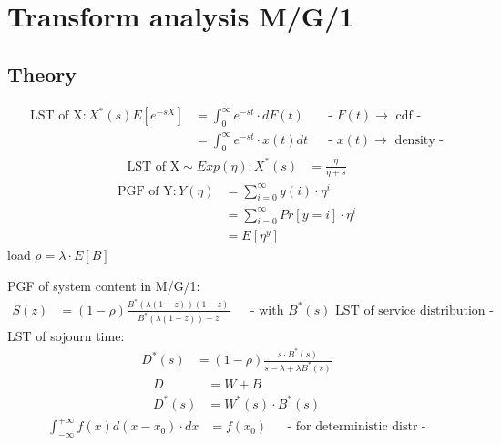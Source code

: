 \section{ Transform analysis M/G/1 }

\subsection*{ Theory }

\begin{align*}
\text{LST of X}:X^{{\ast }}\left(s\right)E\left[e^{{-sX}}\right]&=\int _{0}^{\infty }e^{{-st}}\cdot dF\left(t\right)&& \text{-  $F\left(t\right)\rightarrow $ cdf -}\\
&=\int _{0}^{\infty }e^{{-st}}\cdot x\left(t\right)dt&& \text{-  $x\left(t\right)\rightarrow $ density -}
\end{align*}
\begin{align*}
\text{LST of X} \sim Exp \left(\eta \right):X^{{\ast }}\left(s\right)&=\frac{\eta }{\eta +s}
\end{align*}
\begin{align*}
\text{PGF of Y}:Y\left(\eta \right)&=\sum _{{i=0}}^{\infty }y\left(i\right)\cdot \eta ^{i}\\
&=\sum _{{i=0}}^{\infty }Pr\left[y=i\right]\cdot \eta ^{i}\\
&=E\left[\eta ^{y}\right]
\end{align*}
load $\rho =\lambda \cdot E\left[B\right]$

PGF of system content in M/G/1:
\begin{align*}
S\left(z\right)&=\left(1-\rho \right)\frac{B^{{\ast }}\left(\lambda \left(1-z\right)\right)\left(1-z\right)}{B^{{\ast }}\left(\lambda \left(1-z\right)\right)-z}&& \text{-  with $B^{{\ast }}\left(s\right)$ LST of service distribution -}
\end{align*}
LST of sojourn time:
\begin{align*}
D^{{\ast }}\left(s\right)&=\left(1-\rho \right)\frac{s\cdot B^{{\ast }}\left(s\right)}{s-\lambda +\lambda B^{{\ast }}\left(s\right)}
\end{align*}
\begin{align*}
D&=W+B\\
D^{{\ast }}\left(s\right)&=W^{{\ast }}\left(s\right)\cdot B^{{\ast }}\left(s\right)
\end{align*}
\begin{align*}
\int _{{-\infty }}^{{+\infty }}f\left(x\right)d\left(x-x_{0}\right)\cdot dx&=f\left(x_{0}\right)&& \text{-  for deterministic distr -}
\end{align*}

